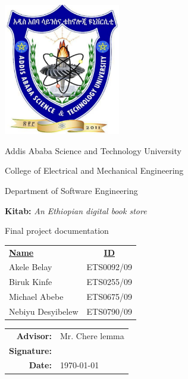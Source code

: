 \begin{titlepage}
	\begin{center}
		\includegraphics[width=2in]{AASTU_logo.png}

		\vspace{1cm}

		\LARGE{Addis Ababa Science and Technology University}

		\LARGE{College of Electrical and Mechanical Engineering}

		\LARGE{Department of Software Engineering}

		\vspace{1cm}
		\Large{\textbf{Kitab:} \textit{An Ethiopian digital book store}}

		\vspace{1cm}
		\Large{Final project documentation}
	
	\end{center}

	\vfill

	\begin{center}
		\begin{tabular}{l c}
			\underline{\textbf{Name}} & \underline{\textbf{ID}} \\
			Akele Belay & ETS0092/09 \\
			Biruk Kinfe & ETS0255/09 \\
			Michael Abebe & ETS0675/09 \\
			Nebiyu Desyibelew & ETS0790/09 \\
		\end{tabular}
	\end{center}

	\vfill

	\begin{flushright}
		\begin{tabular}{r l}
			\textbf{Advisor:} & Mr. Chere lemma \\
			\vspace{0.5cm}
			\textbf{Signature:} & \\
			\vspace{0.5cm}
			\textbf{Date:} & \today \\
		\end{tabular}
	\end{flushright}

\end{titlepage}